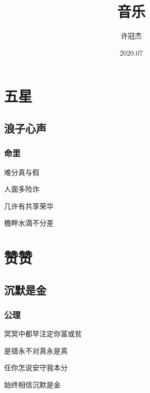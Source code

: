 \documentclass{ctexbeamer}
\title{音乐}
\author{许冠杰}
\date{2020.07}
\institute[中国]{粤语}
\begin{document}
\frame{\titlepage}

\frame{\tableofcontents}
\clearpage

\section{五星}

\subsection{浪子心声}
\begin{frame}
\frametitle{命里}

    难分真与假

    人面多险诈

    几许有共享荣华

    檐畔水滴不分差

\end{frame}

\section{赞赞}

\subsection{沉默是金}
\begin{frame}
\frametitle{公理}

    冥冥中都早注定你富或贫

    是错永不对真永是真

    任你怎说安守我本分

    始终相信沉默是金

\end{frame}
\end{document}
